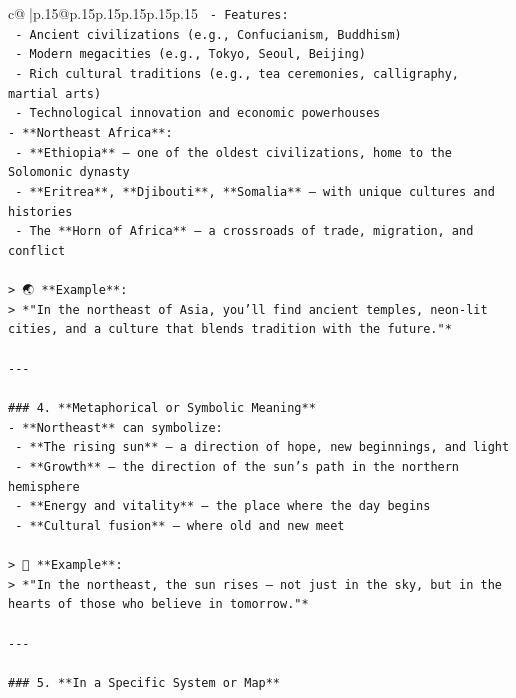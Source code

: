 \documentclass{article}
\begin{document}
{\begin{supertabular}{c@{$\;$}|p{.15\linewidth}@{}p{.15\linewidth}p{.15\linewidth}p{.15\linewidth}p{.15\linewidth}p{.15\linewidth}}
{{{\texttt{  {-} Features:  } \\
\texttt{    {-} Ancient civilizations (e.g., Confucianism, Buddhism)  } \\
\texttt{    {-} Modern megacities (e.g., Tokyo, Seoul, Beijing)  } \\
\texttt{    {-} Rich cultural traditions (e.g., tea ceremonies, calligraphy, martial arts)  } \\
\texttt{    {-} Technological innovation and economic powerhouses  } \\
\texttt{{-} **Northeast Africa**:  } \\
\texttt{  {-} **Ethiopia** — one of the oldest civilizations, home to the Solomonic dynasty  } \\
\texttt{  {-} **Eritrea**, **Djibouti**, **Somalia** — with unique cultures and histories  } \\
\texttt{  {-} The **Horn of Africa** — a crossroads of trade, migration, and conflict} \\
\\ 
\texttt{> 🌏 **Example**:  } \\
\texttt{> *"In the northeast of Asia, you’ll find ancient temples, neon{-}lit cities, and a culture that blends tradition with the future."*} \\
\\ 
\texttt{{-}{-}{-}} \\
\\ 
\texttt{\#\#\# 4. **Metaphorical or Symbolic Meaning**  } \\
\texttt{{-} **Northeast** can symbolize:  } \\
\texttt{  {-} **The rising sun** — a direction of hope, new beginnings, and light  } \\
\texttt{  {-} **Growth** — the direction of the sun’s path in the northern hemisphere  } \\
\texttt{  {-} **Energy and vitality** — the place where the day begins  } \\
\texttt{  {-} **Cultural fusion** — where old and new meet} \\
\\ 
\texttt{> 🌅 **Example**:  } \\
\texttt{> *"In the northeast, the sun rises — not just in the sky, but in the hearts of those who believe in tomorrow."*} \\
\\ 
\texttt{{-}{-}{-}} \\
\\ 
\texttt{\#\#\# 5. **In a Specific System or Map**  } \\
}}}
\end{supertabular}}
\end{document}
